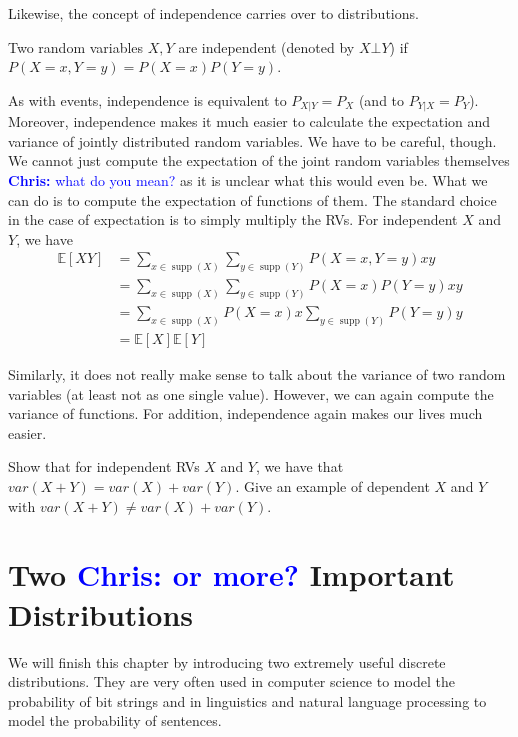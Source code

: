 \documentclass[a4paper,11pt,leqno]{report}
\newcommand{\chris}[1]{ \textcolor{blue}{\textbf{Chris:} #1}}
\newcommand{\supp}{\operatorname{supp}}
\newcommand{\E}{\mathbb{E}}
\begin{document}
Likewise, the concept of independence carries over to distributions.

\begin{Definition}
Two random variables $ X,Y $ are independent (denoted by $ X \bot Y $) if $ P(X=x, Y=y) = P(X=x)P(Y=y) $.
\end{Definition}

As with events, independence is equivalent to $ P_{X|Y} = P_{X} $ (and
to $P_{Y|X}=P_Y$). Moreover, independence makes it much easier to calculate the expectation and variance of jointly distributed random variables. We have to be careful, though. We
cannot just compute the expectation of the joint random variables
themselves\chris{what do you mean?} as it is unclear what this would even be.
What we can do is to compute the expectation of functions of them. The standard choice in the case of expectation
is to simply multiply the RVs. For independent $X$ and $Y$, we have
\begin{align}
\E[XY] &= \sum_{x \in \supp(X)} \sum_{y \in \supp(Y)} P(X=x,Y=y) x y \\
&= \sum_{x \in \supp(X)} \sum_{y \in \supp(Y)} P(X=x)P(Y=y) x y \\
&= \sum_{x \in \supp(X)} P(X=x)x \sum_{y \in \supp(Y)}  P(Y=y) y \\
&= \E[X]\E[Y]
\end{align}

Similarly, it does not really make sense to talk about the variance of two random variables (at least not as one single
value). However, we can again compute the variance of functions. For addition, independence again makes our lives
much easier.

\begin{Exercise}
Show that for independent RVs $X$ and $Y$, we have that $ var(X + Y) =
var(X) + var(Y) $. Give an example of dependent $X$ and $Y$ with $ var(X + Y) \neq
var(X) + var(Y) $.
\end{Exercise}



\section{Two\chris{or more?} Important Distributions}

We will finish this chapter by introducing two extremely useful discrete distributions. They are very often used in
computer science to model the probability of bit strings and in linguistics and natural language processing to model
the probability of sentences. 
\end{document}
